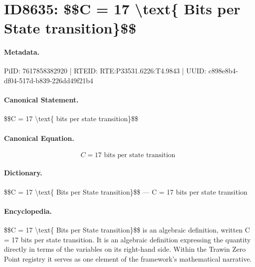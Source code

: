 \section*{ID8635: \$\$C = 17 \textbackslash{}text\{ Bits per State transition\}\$\$}
\paragraph{Metadata.}
PiID: 7617858382920 | RTEID: RTE:P33531.6226:T4.9843 | UUID: c898e8b4-df04-517d-b839-226dd49f21b4

\paragraph{Canonical Statement.}
\$\$C = 17 \textbackslash{}text\{ bits per state transition\}\$\$

\paragraph{Canonical Equation.}
\[
C = 17 \text{ bits per state transition}
\]

\paragraph{Dictionary.}
\$\$C = 17 \textbackslash{}text\{ Bits per State transition\}\$\$ — C = 17 bits per state transition

\paragraph{Encyclopedia.}
\$\$C = 17 \textbackslash{}text\{ Bits per State transition\}\$\$ is an algebraic definition, written C = 17 bits per state transition. It is an algebraic definition expressing the quantity directly in terms of the variables on its right-hand side. Within the Trawin Zero Point registry it serves as one element of the framework's mathematical narrative.
